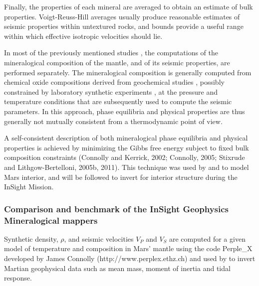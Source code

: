 Finally, the properties of each mineral are averaged to obtain an estimate of bulk properties. Voigt-Reuss-Hill \cite{Hill1952} averages usually produce reasonable estimates of seismic properties within untextured rocks, and \cite{Hashin&Shtrikman1963} bounds provide a useful range within which effective isotropic velocities should lie.

In most of the previously mentioned studies \citep{Mocquet1996, Sohl1997, Bertka1998, Zharkov2005, Verhoeven2005, Rivoldini2011}, the computations of the mineralogical composition of the mantle, and of its seismic properties, are performed separately. The mineralogical composition is generally computed from chemical oxide compositions derived from geochemical studies \citep[reviewed in, e.g.][]{McSween1994, Taylor2013}, possibly constrained by laboratory synthetic experiments \citep{Bertka1997}, at the pressure and temperature conditions that are subsequently used to compute the seismic parameters. In this approach, phase equilibria and physical properties are thus generally not mutually consistent from a thermodynamic point of view.

A self-consistent description of both mineralogical phase equilibria and physical properties is achieved by minimizing the Gibbs free energy subject to fixed bulk composition constraints (Connolly and Kerrick, 2002; Connolly, 2005; Stixrude and Lithgow-Bertelloni, 2005b, 2011). This technique was used by \cite{Khan2008} and \cite{Khan2018} to model Mars interior, and will be followed to invert for interior structure during the InSight Mission.

\subsubsection{Comparison and benchmark of the InSight Geophysics Mineralogical mappers}

Synthetic density, $\rho$, and seismic velocities $V_P$ and $V_S$ are computed for a given model of temperature and composition in Mars' mantle using the code Perple\_X \citep{Connolly2009} developed by James Connolly (http://www.perplex.ethz.ch) and used by \cite{Khan2018} to invert Martian geophysical data such as mean mass, moment of inertia and tidal response.

